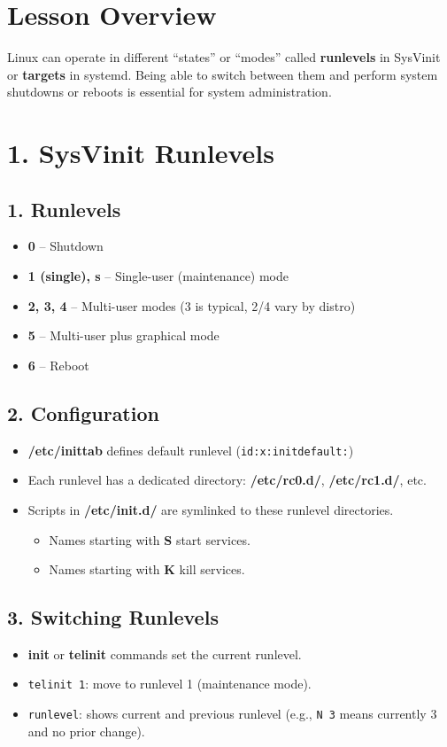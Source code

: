 \documentclass[a4paper]{report}
\begin{document}
\section*{Lesson Overview}

Linux can operate in different “states” or “modes” called \textbf{runlevels} in SysVinit or \textbf{targets} in systemd. Being able to switch between them and perform system shutdowns or reboots is essential for system administration.

\section*{1. SysVinit Runlevels}

\subsection*{1. Runlevels}
\begin{itemize}
    \item \textbf{0} – Shutdown
    \item \textbf{1 (single), s} – Single-user (maintenance) mode
    \item \textbf{2, 3, 4} – Multi-user modes (3 is typical, 2/4 vary by distro)
    \item \textbf{5} – Multi-user plus graphical mode
    \item \textbf{6} – Reboot
\end{itemize}

\subsection*{2. Configuration}
\begin{itemize}
    \item \textbf{/etc/inittab} defines default runlevel (\texttt{id:x:initdefault:})
    \item Each runlevel has a dedicated directory: \textbf{/etc/rc0.d/}, \textbf{/etc/rc1.d/}, etc.
    \item Scripts in \textbf{/etc/init.d/} are symlinked to these runlevel directories.
    \begin{itemize}
        \item Names starting with \textbf{S} start services.
        \item Names starting with \textbf{K} kill services.
    \end{itemize}
\end{itemize}

\subsection*{3. Switching Runlevels}
\begin{itemize}
    \item \textbf{init} or \textbf{telinit} commands set the current runlevel.
    \item \texttt{telinit 1}: move to runlevel 1 (maintenance mode).
    \item \texttt{runlevel}: shows current and previous runlevel (e.g., \texttt{N 3} means currently 3 and no prior change).
\end{itemize}
\end{document}
